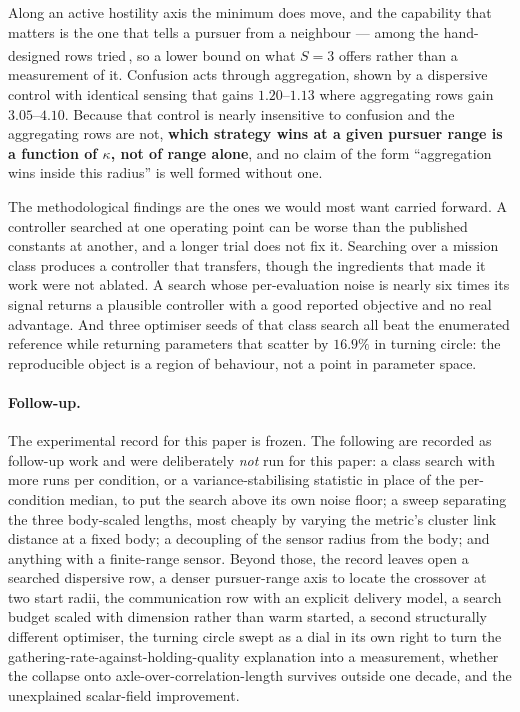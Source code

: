 \documentclass[11pt,a4paper]{article}
\newcommand{\ddg}{\textsuperscript{\ddag}}
\begin{document}
Along an active hostility axis the minimum does move, and the capability that
matters is the one that tells a pursuer from a neighbour --- among the
hand-designed rows tried\,\ddg, so a lower bound on what $S = 3$ offers rather
than a measurement of it. Confusion acts through aggregation, shown by a
dispersive control with identical sensing that gains
$1.20$--$1.13$ where aggregating rows gain $3.05$--$4.10$. Because that control is
nearly insensitive to confusion and the aggregating rows are not, \textbf{which
strategy wins at a given pursuer range is a function of $\kappa$, not of range
alone}, and no claim of the form ``aggregation wins inside this radius'' is well
formed without one.

The methodological findings are the ones we would most want carried forward. A
controller searched at one operating point can be worse than the published
constants at another, and a longer trial does not fix it. Searching over a mission
class produces a controller that transfers, though the ingredients that made it
work were not ablated. A search whose per-evaluation noise is nearly six times its
signal returns a plausible controller with a good reported objective and no real
advantage. And three optimiser seeds of that class search all beat the enumerated
reference while returning parameters that scatter by $16.9\%$ in turning circle:
the reproducible object is a region of behaviour, not a point in parameter
space.

\paragraph{Follow-up.}
The experimental record for this paper is frozen. The following are recorded as
follow-up work and were deliberately \emph{not} run for this paper: a class
search with more runs per condition, or a variance-stabilising statistic in
place of the per-condition median, to put the search above its own noise floor;
a sweep separating the three body-scaled lengths, most cheaply by varying the
metric's cluster link distance at a fixed body; a decoupling of the sensor
radius from the body; and anything with a finite-range sensor. Beyond those, the
record leaves open a searched dispersive row, a denser pursuer-range axis to
locate the crossover at two start radii, the communication row with an explicit
delivery model, a search budget scaled with dimension rather than warm started,
a second structurally different optimiser, the turning circle swept as a dial in
its own right to turn the gathering-rate-against-holding-quality explanation
into a measurement, whether the collapse onto axle-over-correlation-length
survives outside one decade, and the unexplained scalar-field improvement.
\end{document}
